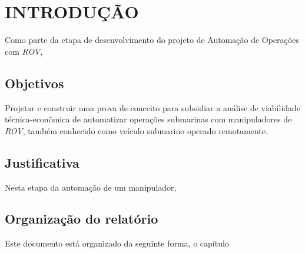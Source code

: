 \chapter{INTRODUÇÃO}
\label{chap:intro}
Como parte da etapa de desenvolvimento do projeto de Automação de Operações com \textit{\acs{ROV}}, 

\section{Objetivos}
\label{sec:obj}
Projetar e construir uma prova de conceito para subsidiar a análise de viabilidade técnica-econômica de automatizar operações submarinas com manipuladores de \textit{\acs{ROV}}, também conhecido como veículo submarino operado remotamente.


\section{Justificativa} %
\label{sec:just}
Nesta etapa da automação de um manipulador, 


\section{Organização do relatório}
\label{sec:org}
Este documento está organizado da seguinte forma, o capítulo 



